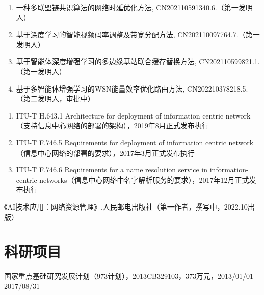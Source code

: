\documentclass{resume}
\begin{document}
\begin{enumerate}
    \item 一种多联盟链共识算法的网络时延优化方法, CN202110591340.6.（第一发明人）
    \item 基于深度学习的智能视频码率调整及带宽分配方法, CN202110097764.7.（第一发明人）
    \item 基于智能体深度增强学习的多边缘基站联合缓存替换方法, CN202110599821.1.（第一发明人）
    \item 基于多智能体增强学习的WSN能量效率优化路由方法, CN202210378218.5.（第二发明人，审批中）
\end{enumerate}
\begin{enumerate}
    \item ITU-T H.643.1 Architecture for deployment of information centric network（支持信息中心网络的部署的架构），2019年8月正式发布执行
    \item ITU-T F.746.5 Requirements for deployment of information centric network（信息中心网络的部署的要求），2017年3月正式发布执行
    \item ITU-T F.746.6 Requirements for a name resolution service in information-centric networks（信息中心网络中名字解析服务的要求），2017年12月正式发布执行
\end{enumerate}
《AI技术应用：网络资源管理》,人民邮电出版社（第一作者，撰写中，2022.10出版）


\section{科研项目}
国家重点基础研究发展计划（973计划），2013CB329103，373万元，2013/01/01-2017/08/31
\end{document}

